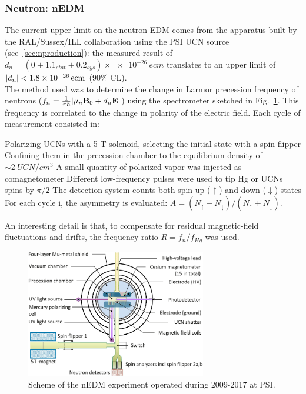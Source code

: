 \begin{refsection}
        \subsubsection{Neutron: nEDM}
            The current upper limit on the neutron EDM comes from the apparatus built by the  RAL/Sussex/ILL collaboration \cite{nEDM} using the PSI UCN source (see~\ref{sec:nproduction}): the measured result of $d_n = (0\pm1.1_{stat}\pm0.2_{sys})\times\SI{e-26}{e cm}$ translates to an upper limit of $\abs{d_n} < \SI{1.8e-26}{ecm}$ (90\% CL).\\
            The method used was to determine the change in Larmor precession frequency of neutrons ($f_n = \frac{1}{\pi\hbar}\abs{\mu_n\textbf{B}_0+d_n\textbf{E}}$) using the spectrometer sketched in Fig.~\ref{fig:nEDM}.
            This frequency is correlated to the change in polarity of the electric field.
            Each cycle of measurement consisted in:
            \begin{outline}
                \1 Polarizing UCNs with a 5 T solenoid, selecting the initial state with a spin flipper
                \1 Confining them in the precession chamber to the equilibrium density of $\sim\SI{2}{UCN/cm^3}$
                \1 A small quantity of polarized  vapor was injected as comagnetometer
                \1 Different low-frequency pulses were used to tip Hg or UCNs spins by $\pi/2$
                \1 The detection system counts both spin-up ($\uparrow$) and down ($\downarrow$) states
                \1 For each cycle i, the asymmetry is evaluated: $ A = (N_\uparrow-N_\downarrow)/(N_\uparrow+N_\downarrow)$.
            \end{outline}
            An interesting detail is that, to compensate for residual magnetic-field fluctuations and drifts, the frequency ratio $R = f_n/f_{Hg}$ was used.
            
            \begin{figure}
                \centering
                \includegraphics[width = 0.7\textwidth]{Figures/Introduction/nEDM.png}
                \caption[EDM: nEDM experiment]{Scheme of the nEDM experiment operated during 2009-2017 at PSI.}
                \label{fig:nEDM}
            \end{figure}
            

\end{refsection}
